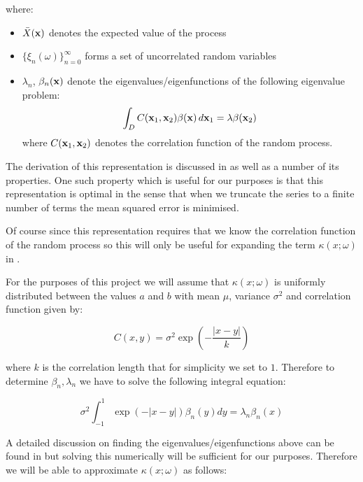 where:

\begin{itemize}
    \item $\bar{X}(\mathbf{x})$ denotes the expected value of the process
    \item $\{\xi_n(\omega)\}_{n=0}^\infty$ forms a set of uncorrelated random
          variables
    \item $\lambda_n$, $\beta_n(\mathbf{x})$ denote the eigenvalues/eigenfunctions
          of the following eigenvalue problem:
          \[
                \int_DC(\mathbf{x}_1, \mathbf{x}_2)\beta(\mathbf{x})\, d\mathbf{x}_1
                = \lambda\beta(\mathbf{x}_2)
          \]
          where $C(\mathbf{x}_1,\mathbf{x}_2)$ denotes the correlation function of the
          random process.
\end{itemize}

The derivation of this representation is discussed in \cite{stochastic-fem} as
well as a number of its properties. One such property which is useful for our
purposes is that this representation is optimal in the sense that when we
truncate the series to a finite number of terms the mean squared error is
minimised.

Of course since this representation requires that we know the correlation
function of the random process so this will only be useful for expanding the
term $\kappa(x;\omega)$ in .

For the purposes of this project we will assume that $\kappa(x;\omega)$ is
uniformly distributed between the values $a$ and $b$ with mean $\mu$,
variance $\sigma^2$ and correlation function given by:

\begin{equation}
    C(x, y) = \sigma^2\exp\left(-\frac{|x - y|}{k}\right)
\end{equation}

where $k$ is the correlation length that for simplicity we set to $1$.
Therefore to determine $\beta_n, \lambda_n$ we have to solve the following
integral equation:

\begin{equation}\label{eq:oned-stochastic-kle-eigenvalue-problem}
    \sigma^2\int_{-1}^1\exp(-|x - y|)\beta_n(y) dy = \lambda_n\beta_n(x)
\end{equation}

A detailed discussion on finding the eigenvalues/eigenfunctions above can be
found in \cite{stochastic-fem} but solving this numerically will be sufficient
for our purposes. Therefore we will be able to approximate $\kappa(x;\omega)$
as follows:

